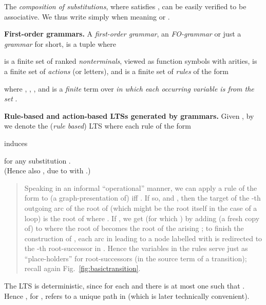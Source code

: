 \documentclass{llncs}
\begin{document}
The 
\emph{composition of substitutions}, where
 satisfies
, 
can be easily verified to be
associative. We thus write simply  when meaning 
 or  . 

\textbf{First-order grammars.}
A \emph{first-order grammar}, an \emph{FO-grammar} or
just a \emph{grammar} for short, is a tuple
 where 

is a finite set of 
ranked \emph{nonterminals}, viewed as function symbols with
arities, 
is a finite set of \emph{actions} (or letters), 
and 
is
a finite set of 
\emph{rules} of the form
\begin{center}

\end{center}
where , , 
,
and  is a
\emph{finite}  
term over  
\emph{in which each occurring variable 
is
from the set} .






\textbf{Rule-based and action-based LTSs generated by grammars.}
Given , 
by 
we denote the (\emph{rule based}) LTS
where each rule  of the form
 
induces
	
for any substitution .
\\
(Hence also , due to 
with .)

\begin{quote}
{\small
Speaking in an informal 
``operational'' manner,
we can apply a rule  of the form  
to (a graph-presentation of)
 iff 
.
If so, and , then the
target of the -th outgoing arc of the root of 
(which might be the root itself in the case of a loop) is the root of 
 where .
If , we get  (for which )
by adding (a fresh copy of) 
to  where the root of  becomes the root of the arising ; 
to finish the construction of , 
each
arc in
 leading to a node labelled with  is redirected to 
the -th root-successor in . 
Hence the variables  in the rules serve just as
``place-holders'' for root-successors (in the source term of a
transition); recall again Fig.~\ref{fig:basictransition}.
}
\end{quote}
The LTS  is deterministic, since for each 
and  there is at most one  such that .
Hence , for , refers to a unique path in
 (which is later technically convenient).
\end{document}
